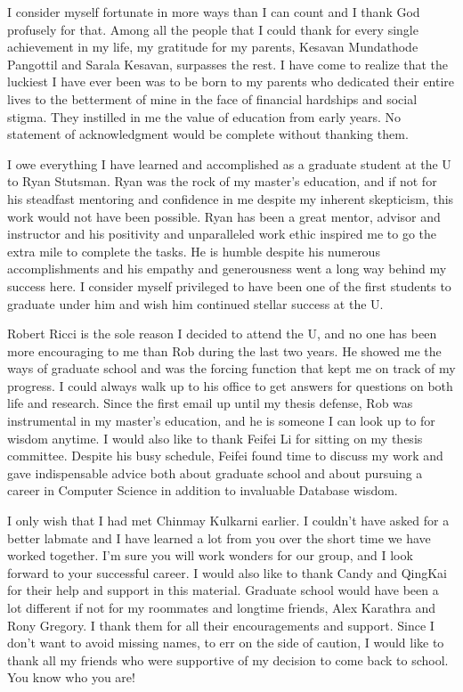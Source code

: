 I consider myself fortunate in more ways than I can count and I thank God profusely for that. Among all the people that I could thank for every single achievement in my life, my gratitude for my parents, Kesavan Mundathode Pangottil
and Sarala Kesavan, surpasses the rest. I have come to realize that the luckiest I have ever been was to be born to my parents who dedicated their entire lives to the betterment of mine in the face of financial hardships and social stigma. They instilled in me the value of education from early years. No statement of acknowledgment would be complete without thanking them.

I owe everything I have learned and accomplished as a graduate student at the U to Ryan Stutsman. Ryan was the rock of my master's education, and if not for his steadfast mentoring and confidence in me despite my inherent skepticism, this work would not have been possible.
Ryan has been a great mentor, advisor and instructor and his positivity and unparalleled work ethic inspired me to go the extra mile to complete the tasks. He is humble despite his numerous accomplishments and his empathy and generousness went a long way behind my success here.
I consider myself privileged to have been one of the first students to graduate under him and wish him continued stellar success at the U.

Robert Ricci is the sole reason I decided to attend the U, and no one has been more encouraging to me than Rob during the last two years. He showed me the ways of graduate school and
was the forcing function that kept me on track of my progress. I could always walk up to his office to get answers for questions on both life and research. Since the first email up until my thesis defense, Rob was instrumental in my master's education, and he is someone I can look up to for wisdom anytime.
I would also like to thank Feifei Li for sitting on my thesis committee. Despite his busy schedule, Feifei found time to discuss my work and gave indispensable advice both about graduate school and about pursuing a career in Computer Science in addition to invaluable Database wisdom.

I only wish that I had met Chinmay Kulkarni earlier. I couldn't have asked for a better labmate and I have learned a lot from you over the short time we have worked together.
I'm sure you will work wonders for our group, and I look forward to your successful career. I would also like to thank Candy and QingKai for their help and support in this material.
Graduate school would have been a lot different if not for my roommates and longtime friends, Alex Karathra and Rony Gregory. I thank them for all their encouragements and support.
Since I don't want to avoid missing names, to err on the side of caution, I would like to thank all my friends who were supportive of my decision to come back to school. You know who you are!

